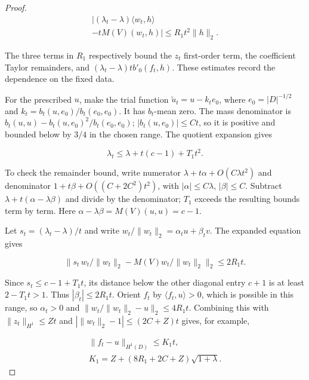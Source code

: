 \documentclass[11pt]{article}
\theoremstyle{definition}
\theoremstyle{remark}
\numberwithin{equation}{section}
\begin{document}
\begin{proof}
\begin{equation}\label{eq:src-11-16}
\begin{gathered}
\big| (\lambda_t-\lambda)\langle w_t,h\rangle \\
-t M(V)(w_t,h)\big|\le R_1t^2\|h\|_2.
\end{gathered}
\end{equation}

The three terms in $R_1$ respectively bound the $z_t$ first-order term, the coefficient Taylor remainders, and $(\lambda_t-\lambda)t b'_0(f_t,h)$. These estimates record the dependence on the fixed data.

For the prescribed $u$, make the trial function $\widetilde u_t=u-k_te_0$, where $e_0=|D|^{-1/2}$ and $k_t=b_t(u,e_0)/b_t(e_0,e_0)$. It has $b_t$-mean zero. The mass denominator is $b_t(u,u)-b_t(u,e_0)^2/b_t(e_0,e_0)$; $|b_t(u,e_0)|\le Ct$, so it is positive and bounded below by $3/4$ in the chosen range. The quotient expansion gives

\begin{equation}\label{eq:src-11-17}
\lambda_t\le\lambda+t(c-1)+T_1t^2.
\end{equation}

To check the remainder bound, write numerator $\lambda+t\alpha+O(C\lambda t^2)$ and denominator $1+t\beta+O((C+2C^2)t^2)$, with $|\alpha|\le C\lambda$, $|\beta|\le C$. Subtract $\lambda+t(\alpha-\lambda\beta)$ and divide by the denominator; $T_1$ exceeds the resulting bounds term by term. Here $\alpha-\lambda\beta=M(V)(u,u)=c-1$.

Let $s_t=(\lambda_t-\lambda)/t$ and write $w_t/\|w_t\|_2=\alpha_tu+\beta_tv$. The expanded equation gives

\begin{equation}\label{eq:src-11-18}
\big\|s_t\,w_t/\|w_t\|_2-M(V)w_t/\|w_t\|_2\big\|_2\le2R_1t.
\end{equation}

Since $s_t\le c-1+T_1t$, its distance below the other diagonal entry $c+1$ is at least $2-T_1t>1$. Thus $|\beta_t|\le2R_1t$. Orient $f_t$ by $\langle f_t,u\rangle>0$, which is possible in this range, so $\alpha_t>0$ and $\|w_t/\|w_t\|_2-u\|_2\le4R_1t$. Combining this with $\|z_t\|_{H^1}\le Zt$ and $|\|w_t\|_2-1|\le(2C+Z)t$ gives, for example,

\begin{equation}\label{eq:src-11-19}
\begin{gathered}
\|f_t-u\|_{H^1(D)}\le K_1t,\quad \\
K_1=Z+(8R_1+2C+Z)\sqrt{1+\lambda}.
\end{gathered}
\end{equation}


\end{proof}
\end{document}
